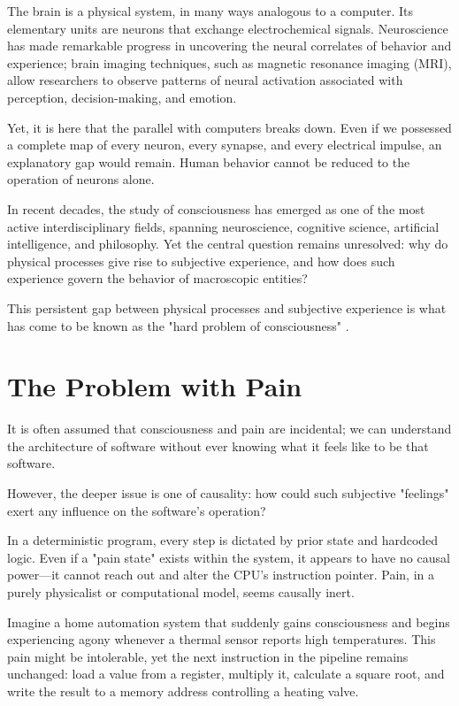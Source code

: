 The brain is a physical system, in many ways analogous to a computer.
Its elementary units are neurons that exchange electrochemical signals.
Neuroscience has made remarkable progress in uncovering the neural correlates of behavior and experience; brain imaging techniques, such as magnetic resonance imaging (MRI), allow researchers to observe patterns of neural activation associated with perception, decision-making, and emotion.

Yet, it is here that the parallel with computers breaks down.
Even if we possessed a complete map of every neuron, every synapse, and every electrical impulse, an explanatory gap would remain.
Human behavior cannot be reduced to the operation of neurons alone.

In recent decades, the study of consciousness has emerged as one of the most active interdisciplinary fields, spanning neuroscience, cognitive science, artificial intelligence, and philosophy.
Yet the central question remains unresolved: why do physical processes give rise to subjective experience, and how does such experience govern the behavior of macroscopic entities?

This persistent gap between physical processes and subjective experience is what has come to be known as the "hard problem of consciousness" \cite{chalmers1995facing}.


\section{The Problem with Pain}

It is often assumed that consciousness and pain are incidental; we can understand the architecture of software without ever knowing what it feels like to be that software.

However, the deeper issue is one of causality: how could such subjective "feelings" exert any influence on the software’s operation?

In a deterministic program, every step is dictated by prior state and hardcoded logic. Even if a "pain state" exists within the system, it appears to have no causal power—it cannot reach out and alter the CPU's instruction pointer. Pain, in a purely physicalist or computational model, seems causally inert.

Imagine a home automation system that suddenly gains consciousness and begins experiencing agony whenever a thermal sensor reports high temperatures. This pain might be intolerable, yet the next instruction in the pipeline remains unchanged: load a value from a register, multiply it, calculate a square root, and write the result to a memory address controlling a heating valve.


